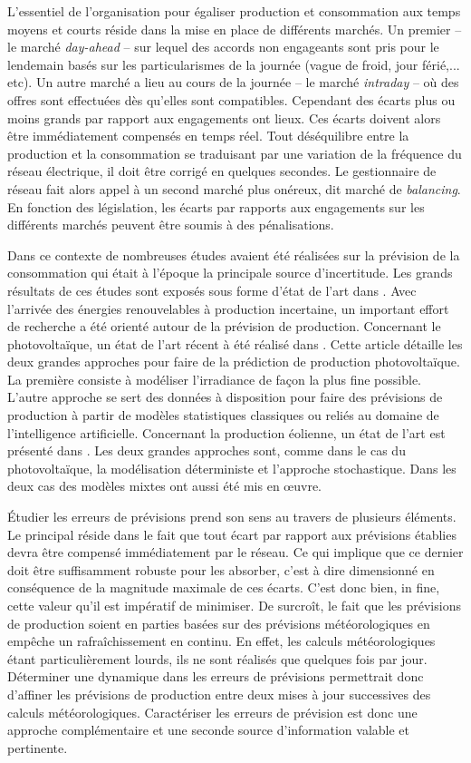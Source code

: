 \documentclass[12pt, french]{report}
\begin{document}
L'essentiel de l'organisation pour égaliser production et consommation aux temps moyens et courts réside dans la mise en place de différents marchés. Un premier -- le marché \textit{day-ahead} -- sur lequel des accords non engageants sont pris pour le lendemain basés sur les particularismes de la journée (vague de froid, jour férié,... etc). Un autre marché a lieu au cours de la journée -- le marché \textit{intraday} -- où des offres sont effectuées dès qu'elles sont compatibles. Cependant des écarts plus ou moins grands par rapport aux engagements ont lieux. Ces écarts doivent alors être immédiatement compensés en temps réel. Tout déséquilibre entre la production et la consommation se traduisant par une variation de la fréquence du réseau électrique, il doit être corrigé en quelques secondes. Le gestionnaire de réseau fait alors appel à un second marché plus onéreux, dit marché de \textit{balancing}. En fonction des législation, les écarts par rapports aux engagements sur les différents marchés peuvent être soumis à des pénalisations.

Dans ce contexte de nombreuses études avaient été réalisées sur la prévision de la consommation qui était à l'époque la principale source d'incertitude. Les grands résultats de ces études sont exposés sous forme d'état de l'art dans \cite{suganthi_Energy_2012}. Avec l'arrivée des énergies renouvelables à production incertaine, un important effort de recherche a été orienté autour de la prévision de production. Concernant le photovoltaïque, un état de l'art récent à été réalisé dans \cite{antonanzas_review_2016}. Cette article détaille les deux grandes approches pour faire de la prédiction de production photovoltaïque. La première consiste à modéliser l'irradiance de façon la plus fine possible. L'autre approche se sert des données à disposition pour faire des prévisions de production à partir de modèles statistiques classiques ou reliés au domaine de l'intelligence artificielle. Concernant la production éolienne, un état de l'art est présenté dans \cite{jung_current_2014}. Les deux grandes approches sont, comme dans le cas du photovoltaïque, la modélisation déterministe et l'approche stochastique. Dans les deux cas des modèles mixtes ont aussi été mis en œuvre.

Étudier les erreurs de prévisions prend son sens au travers de plusieurs éléments. Le principal réside dans le fait que tout écart par rapport aux prévisions établies devra être compensé immédiatement par le réseau. Ce qui implique que ce dernier doit être suffisamment robuste pour les absorber, c'est à dire dimensionné en conséquence de la magnitude maximale de ces écarts. C'est donc bien, in fine, cette valeur qu'il est impératif de minimiser. De surcroît, le fait que les prévisions de production soient en parties basées sur des prévisions météorologiques en empêche un rafraîchissement en continu. En effet, les calculs météorologiques étant particulièrement lourds, ils ne sont réalisés que quelques fois par jour. Déterminer une dynamique dans les erreurs de prévisions permettrait donc d'affiner les prévisions de production entre deux mises à jour successives des calculs météorologiques. Caractériser les erreurs de prévision est donc une approche complémentaire et une seconde source d'information valable et pertinente.
\end{document}
